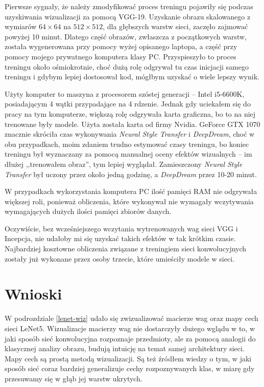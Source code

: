 Pierwsze sygnały, że należy zmodyfikować proces treningu pojawiły się podczas uzyskiwania wizualizacji za pomocą VGG-19.
Uzyskanie obrazu skalowanego z wymiarów \(64 \times 64\) na \(512 \times 512\), dla głębszych warstw sieci, zaczęło zajmować powyżej 10 minut.
Dlatego część obrazów, zwłaszcza z początkowych warstw, została wygenerowana przy pomocy wyżej opisanego laptopa, a część przy pomocy mojego prywatnego komputera klasy PC. Przyspieszyło to proces treningu około ośmiokrotnie, choć dużą rolę odgrywał tu czas inicjacji samego treningu i gdybym lepiej dostosował kod, mógłbym uzyskać o wiele lepszy wynik.

Użyty komputer to maszyna z procesorem szóstej generacji -- Intel i5-6600K, posiadającym 4 wątki przypadające na 4 rdzenie. Jednak gdy uciekałem się do pracy na tym komputerze, większą rolę odgrywała karta graficzna, bo to na niej trenowane były modele. Użyta została karta od firmy Nvidia. GeForce GTX 1070 znacznie skróciła czas wykonywania \textit{Neural Style Transfer} i \textit{DeepDream}, choć w obu przypadkach, moim zdaniem trudno estymować czasy treningu, bo koniec treningu był wyznaczany za pomocą
manualnej oceny efektów wizualnych -- im dłużej ,,trenowałem obraz'', tym lepiej wyglądał. Zamieszczony \textit{Neural Style Transfer} był uczony przez około jedną godzinę, a \textit{DeepDream} przez 10-20 minut.

W przypadkach wykorzystania komputera PC ilość pamięci RAM nie odgrywała większej roli, ponieważ obliczenia, które wykonywał nie wymagały wczytywania wymagających dużych ilości pamięci zbiorów danych.

Oczywiście, bez wcześniejszego wczytania wytrenowanych wag sieci VGG i Incepcja, nie udałoby mi się uzyskać takich efektów w tak krótkim czasie. Najbardziej kosztowne obliczenia związane z treningiem sieci konwolucyjnych zostały już wykonane przez osoby trzecie, które umieściły modele w sieci.

\section{Wnioski}
W podrozdziale \ref{lenet-wiz} udało się zwizualizować macierze wag oraz mapy cech sieci LeNet5. Wizualizacje macierzy wag nie dostarczyły dużego wglądu w to, w jaki sposób sieć konwolucyjna rozpoznaje przedmioty, ale za pomocą analogii do klasycznej analizy obrazu, budują intuicję na temat samej architektury sieci. Mapy cech są prostą metodą wizualizacji. Są też źródłem wiedzy o tym, w jaki sposób sieć coraz bardziej generalizuje cechy rozpoznywanych klas, w miarę gdy przesuwamy się
w głąb jej warstw ukrytych.  

